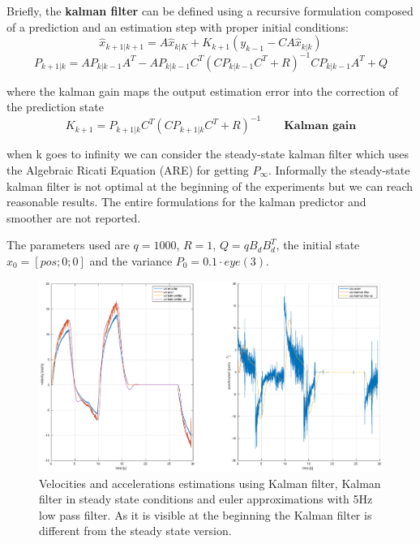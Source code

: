 \documentclass[a4paper,12pt]{article}
\begin{document}
\bigskip
\noindent Briefly, the \textbf{kalman filter} can be defined using a recursive formulation composed of a prediction and an estimation step with proper initial conditions:
\[
    \hat{x}_{k+1|k+1} = A\hat{x}_{k|K} + K_{k+1}(y_{k-1} - CA\hat{x}_{k|k})
\]   
\[
    P_{k+1|k} = AP_{k|k-1}A^T - AP_{k|k-1}C^T(CP_{k|k-1}C^T + R)^{-1}CP_{k|k-1}A^T+Q
\]

\bigskip
where the kalman gain maps the output estimation error into the correction of the prediction state
\[
    K_{k+1} = P_{k+1|k}C^T(CP_{k+1|k}C^T+R)^{-1} \qquad \textbf{Kalman gain}
\]

when k goes to infinity we can consider the steady-state kalman filter which uses the Algebraic Ricati Equation (ARE) for getting $P_{\infty}$. Informally the steady-state kalman filter is not optimal at the beginning of the experiments but we can reach reasonable results. The entire formulations for the kalman predictor and smoother are not reported.

The parameters used are $q = 1000$, $R = 1$, $Q = qB_dB_d^T$, the initial state $x_0 = [pos; 0; 0]$ and the variance $P_0 = 0.1 \cdot eye(3)$.

\begin{figure}[H]
    \begin{center}
        \hspace*{-4.6cm}
        \includegraphics[scale=0.5]{images/kalman_filter.eps}
    \end{center}
    \caption{Velocities and accelerations estimations using Kalman filter, Kalman filter in steady state conditions and euler approximations with 5Hz low pass filter. As it is visible at the beginning the Kalman filter is different from the steady state version.}
    \label{fig:kalman_filter}
\end{figure}
\end{document}
